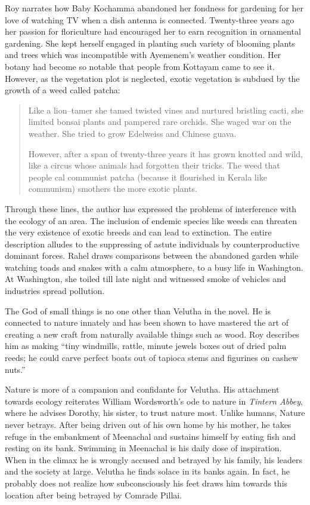 Roy narrates how Baby Kochamma abandoned her fondness for gardening for her love of watching TV when a dish antenna is connected. Twenty-three years ago her passion for floriculture had encouraged her to earn recognition in ornamental gardening. She kept herself engaged in planting such variety of blooming plants and trees which was incompatible with Ayemenem's weather condition. Her botany had become so notable that people from Kottayam came to see it. However, as the vegetation plot is neglected, exotic vegetation is subdued by the growth of a weed called patcha:

\begin{quote}
  Like a lion–tamer she tamed twisted vines and nurtured bristling cacti, she limited bonsai plants and pampered rare orchids. She waged war on the weather. She tried to grow Edelweiss and Chinese guava. \parencite[26-27]{Roy1997}

  However, after a span of twenty-three years it has grown knotted and wild, like a circus whose animals had forgotten their tricks. The weed that people cal communist patcha (because it flourished in Kerala like communism) smothers the more exotic plants. \parencite[27]{Roy1997}
\end{quote}

Through these lines, the author has expressed the problems of interference with the ecology of an area. The inclusion of endemic species like weeds can threaten the very existence of exotic breeds and can lead to extinction. The entire description alludes to the suppressing of astute individuals by counterproductive dominant forces. Rahel draws comparisons between the abandoned garden while watching toads and snakes with a calm atmosphere, to a busy life in Washington. At Washington, she toiled till late night and witnessed smoke of vehicles and industries spread pollution.

The God of small things is no one other than Velutha in the novel. He is connected to nature innately and has been shown to have mastered the art of creating a new craft from naturally available things such as wood. Roy describes him as making ``tiny windmills, rattle, minute jewels boxes out of dried palm reeds; he could carve perfect boats out of tapioca stems and figurines on cashew nuts.'' \parencite[74]{Roy1997}

Nature is more of a companion and confidante for Velutha. His attachment towards ecology reiterates William Wordsworth's ode to nature in \emph{Tintern Abbey}, where he advises Dorothy, his sister, to trust nature most. Unlike humans, Nature never betrays. After being driven out of his own home by his mother, he takes refuge in the embankment of Meenachal and sustains himself by eating fish and resting on its bank. Swimming in Meenachal is his daily dose of inspiration. When in the climax he is wrongly accused and betrayed by his family, his leaders and the society at large. Velutha he finds solace in its banks again. In fact, he probably does not realize how subconsciously his feet draws him towards this location after being betrayed by Comrade Pillai.

